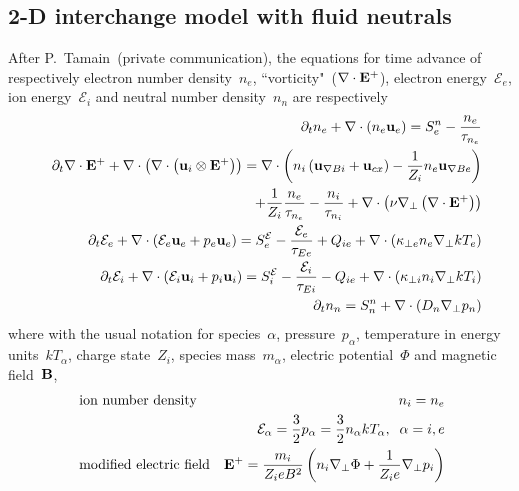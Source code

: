\subsection{2-D interchange model with fluid neutrals}\label{sec:2D_interchange}

After P.~Tamain~(private communication), the equations for time advance
of respectively electron number density~$n_e$, ``vorticity"~($\nabla \cdot {\bf E}^{+}$),
electron energy~$\mathcal{E}_e$, ion energy~$\mathcal{E}_i$ and 
neutral number density~$n_n$ are respectively
\begin{eqnarray}
& & \partial_t n_e + \nabla \cdot \left( n_e {\bf u}_e \right) = 
S^n_{e} - \frac{n_e}{\tau_{n_e}} \\
& & \partial_t \nabla \cdot {\bf E}^{+} + \nabla \cdot 
\left( \nabla \cdot \left( {\bf u}_i \otimes {\bf E}^{+} \right) 
\right) = \nabla \cdot \left( n_i \left( {\bf u}_{\nabla B i} + 
{\bf u}_{cx} \right) - \frac{1}{{Z_i}} n_e {\bf u}_{\nabla B 
e} \right) \nonumber \\
& & \hspace{5cm} + \frac{1}{{Z_i}} \frac{n_e}{\tau_{n_e}} - 
\frac{n_i}{\tau_{n_i}} + \nabla \cdot \left( {\nu} 
\nabla_\perp \left( \nabla \cdot {\bf E}^{+} \right) 
\right) \\
& & \partial_t \mathcal{E}_e + \nabla \cdot \left( \mathcal{E}_e {\bf u}_e + p_e 
{\bf u}_e \right) = S^{\mathcal{E}}_{e} - \frac{\mathcal{E}_e}{\tau_{Ee}} + Q_{ie} + 
\nabla \cdot \left( {\kappa_{\perp e}} n_e 
\nabla_\perp kT_e \right) \\
& & \partial_t \mathcal{E}_i + \nabla \cdot \left( \mathcal{E}_i {\bf u}_i + p_i 
{\bf u}_i \right) = S^{\mathcal{E}}_{i} - \frac{\mathcal{E}_i}{\tau_{Ei}} - Q_{ie} + 
\nabla \cdot \left( {\kappa_{\perp i}} n_i 
\nabla_\perp kT_i \right) \\
& & \partial_t n_n = S^n_{n} + \nabla \cdot \left( D_n  
\nabla_\perp p_n \right)
\end{eqnarray}
where with the usual notation for species~$\alpha$, pressure~$p_\alpha$,
temperature in energy units~$kT_\alpha$, charge state~$Z_i$,
species mass~$m_\alpha$, electric potential~$\Phi$ and magnetic field~${\bf B}$, 
\begin{eqnarray}
& \mbox{ ion number density} & n_i = n_e \\
& & \mathcal{E}_{\alpha} = \frac{3}{2} p_{\alpha}  = \frac{3}{2} n_{\alpha} kT_{\alpha},\;\; \alpha=i,e \\
& \mbox{ modified electric field} & {\bf E}^{+} = \frac{m_i}{Z_i e B^2} \left( n_i \nabla_\perp 
\Phi + \frac{1}{Z_i e} \nabla_\perp p_i \right) \\
\end{eqnarray}


